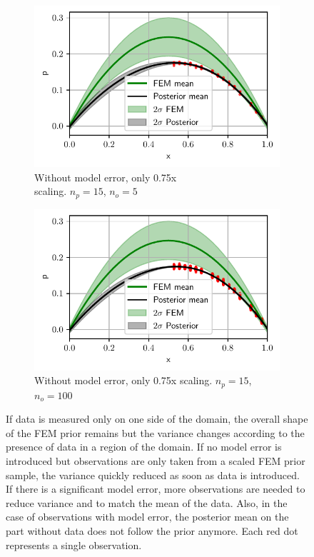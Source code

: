 \documentclass[%
  a4paper,oneside,%
  11pt,%
  smallchapters,
  style=printdev,
  extramargin,
  green,%
  rgb, <cmyk>
  ]{tubsbook}
\begin{document}
\begin{figure}[!ht]
	\begin{subfigure}[t]{.5\textwidth}
	\centering
	\includegraphics[width=1\linewidth]{../../Python/Results/1D/HalfSide/No_Model_Error/5o_15s/Result.pdf}
	\caption{Without model error, only 0.75x\\
	 scaling. ${n_p=15}$, ${n_o=5}$}
		\label{fig:1DOneSidedc}
	\end{subfigure}%
	\begin{subfigure}[t]{.5\textwidth}
	\centering
	\includegraphics[width=1\linewidth]{../../Python/Results/1D/HalfSide/No_Model_Error/100o_15s/Result.pdf}
	\caption{Without model error, only 0.75x scaling. ${n_p=15}$, ${n_o=100}$}
	\label{fig:1DOneSidedd}
	\end{subfigure}

\caption[Posterior of the 1D example for observations only on one side of the domain]{If data is measured only on one side of the domain, the overall shape of the FEM prior remains but the variance changes according to the presence of data in a region of the domain. If no model error is introduced but observations are only taken from a scaled FEM prior sample, the variance quickly reduced as soon as data is introduced. If there is a significant model error, more observations are needed to reduce variance and to match the mean of the data. Also, in the case of observations with model error, the posterior mean on the part without data does not follow the prior anymore. Each red dot represents a single observation.}
\label{fig:1DOneSided}
\end{figure}
%
\end{document}

